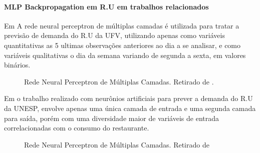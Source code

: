 \documentclass[	12pt, Times, openright, twoside, a4paper, english, brazil]{abntex2}
\begin{document}
  	       \paragraph*{MLP Backpropagation em R.U em trabalhos relacionados}
  	       Em \cite{Lopes2008} A rede neural perceptron de múltiplas camadas é utilizada para tratar a previsão de demanda do R.U da UFV, utilizando apenas como variáveis quantitativas as 5 ultimas observações anteriores ao dia a se analisar, e como variáveis qualitativas o dia da semana variando de segunda a sexta, em valores binários.
  	       
           \begin{figure}[!ht]
          	\caption{Rede Neural Perceptron de Múltiplas Camadas. Retirado de \cite{Lopes2008}.\label{fig:mlp-lopes}}
           \end{figure}
            
           Em \cite{Rocha2011} o trabalho realizado com neurônios artificiais para prever a demanda do R.U da UNESP, envolve apenas uma única camada de entrada e uma segunda camada para saída, porém com uma diversidade maior de variáveis de entrada correlacionadas com o consumo do restaurante. 
           \begin{figure}[!ht]
          	\caption{Rede Neural Perceptron de Múltiplas Camadas. Retirado de  \cite{Rocha2011} \label{fig:rnaRocha}}
           \end{figure}
         
\end{document}
